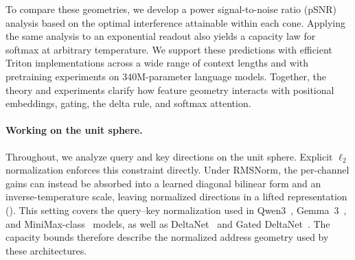 \documentclass{article}
\newcommand{\1}{\bm{1}}
\def\gO{{\mathcal{O}}}
\theoremstyle{definition}
\begin{document}
To compare these geometries, we develop a power signal-to-noise ratio (pSNR) analysis based on
the optimal interference attainable within each cone. Applying the same analysis to an exponential
readout also yields a capacity law for softmax at arbitrary temperature. We support these predictions
with efficient Triton implementations across a wide range of context lengths and with pretraining
experiments on 340M-parameter language models. Together, the theory and experiments clarify how
feature geometry interacts with positional embeddings, gating, the delta rule, and softmax attention.

\paragraph{Working on the unit sphere.} Throughout, we analyze query and key directions on the
unit sphere. Explicit $\ell_2$ normalization enforces this constraint directly. Under RMSNorm, the
per-channel gains can instead be absorbed into a learned diagonal bilinear form and an
inverse-temperature scale, leaving normalized directions in a lifted representation
(). This setting covers the query--key normalization used in
Qwen3~\citep{yang25qwen3}, Gemma~3~\citep{kamath25gemma3}, and
MiniMax-class~\citep{chen26minimax} models, as well as DeltaNet~\citep{yang24deltanet} and Gated
DeltaNet~\citep{yang25gateddeltanet}. The capacity bounds therefore describe the normalized address
geometry used by these architectures.
\end{document}
